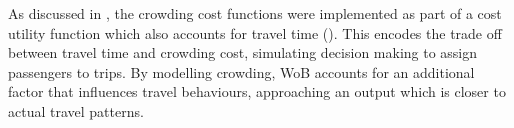 As discussed in , the crowding cost functions were implemented as part of a cost utility function which also accounts for travel time (). This encodes the trade off between travel time and crowding cost, simulating decision making to assign passengers to trips. By modelling crowding, WoB accounts for an additional factor that influences travel behaviours, approaching an output which is closer to actual travel patterns. 




